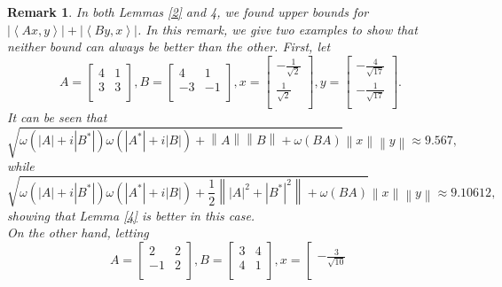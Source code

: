 \documentclass[12pt,twoside,reqno]{amsart}
\newtheorem{remark}{Remark}[section]
\numberwithin{equation}{section}
\begin{document}
\begin{remark}\label{Rem_222}
In both Lemmas \ref{2} and {4}, we found upper bounds for $\left| \left\langle Ax,y \right\rangle  \right|+\left| \left\langle By,x \right\rangle  \right|$. In this remark, we give two examples to show that neither bound can always be better than the other. First, let
\[A=\left[
\begin{array}{cc}
 4 & 1 \\
 3 & 3 \\
\end{array}
\right], B=\left[
\begin{array}{cc}
 4& 1 \\
 -3 & -1 \\
\end{array}
\right], x=\left[
\begin{array}{c}
 -\frac{1}{\sqrt{2}} \\
 \frac{1}{\sqrt{2}} \\
\end{array}
\right], y=\left[
\begin{array}{c}
 -\frac{4}{\sqrt{17}} \\
 -\frac{1}{\sqrt{17}} \\
\end{array}
\right].\]
It can be seen that
\[\sqrt{\omega \left( \left| A \right|+i\left| {{B}^{*}} \right| \right)\omega \left( \left| {{A}^{*}} \right|+i\left| B \right| \right)+\left\| A \right\|\left\| B \right\|+\omega \left( BA \right)}\left\| x \right\|\left\| y \right\|\approx 9.567,\]
while
\[\sqrt{\omega \left( \left| A \right|+i\left| {{B}^{*}} \right| \right)\omega \left( \left| {{A}^{*}} \right|+i\left| B \right| \right)+\frac{1}{2}\left\| {{\left| A \right|}^{2}}+{{\left| {{B}^{*}} \right|}^{2}} \right\|+\omega \left( BA \right)}\left\| x \right\|\left\| y \right\|\approx 9.10612,\]
showing that Lemma \ref{4} is better in this case.\\
On the other hand, letting
\[A=\left[
\begin{array}{cc}
 2 & 2 \\
 -1 & 2 \\
\end{array}
\right], B=\left[
\begin{array}{cc}
 3 & 4 \\
 4 & 1 \\
\end{array}
\right], x=\left[
\begin{array}{c}
 -\frac{3}{\sqrt{10}} \\

\end{array}\]
\end{remark}
\end{document}
